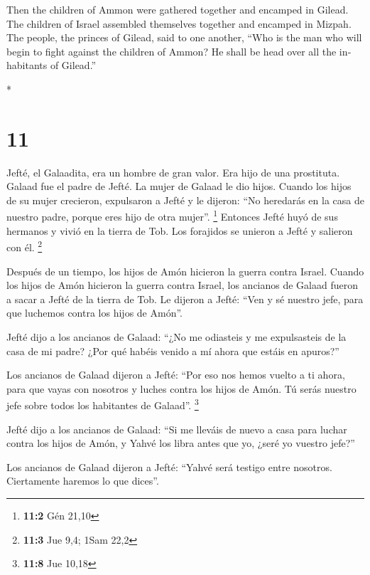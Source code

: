 \begin{paracol}{2}
\begin{otherlanguage}{english}
 Then the children of Ammon were gathered together and
encamped in Gilead. The children of Israel assembled themselves together
and encamped in Mizpah.  The people, the princes of
Gilead, said to one another, ``Who is the man who will begin to fight
against the children of Ammon? He shall be head over all the inhabitants
of Gilead.''

\end{otherlanguage}

\switchcolumn[0]*

\hypertarget{section-20}{%
\section{11}\label{section-20}}

 Jefté, el Galaadita, era un hombre de gran valor. Era
hijo de una prostituta. Galaad fue el padre de Jefté.  La
mujer de Galaad le dio hijos. Cuando los hijos de su mujer crecieron,
expulsaron a Jefté y le dijeron: ``No heredarás en la casa de nuestro
padre, porque eres hijo de otra mujer''. \footnote{\textbf{11:2} Gén
  21,10}  Entonces Jefté huyó de sus hermanos y vivió en
la tierra de Tob. Los forajidos se unieron a Jefté y salieron con él.
\footnote{\textbf{11:3} Jue 9,4; 1Sam 22,2}

 Después de un tiempo, los hijos de Amón hicieron la
guerra contra Israel.  Cuando los hijos de Amón hicieron
la guerra contra Israel, los ancianos de Galaad fueron a sacar a Jefté
de la tierra de Tob.  Le dijeron a Jefté: ``Ven y sé
nuestro jefe, para que luchemos contra los hijos de Amón''.

 Jefté dijo a los ancianos de Galaad: ``¿No me odiasteis y
me expulsasteis de la casa de mi padre? ¿Por qué habéis venido a mí
ahora que estáis en apuros?''

 Los ancianos de Galaad dijeron a Jefté: ``Por eso nos
hemos vuelto a ti ahora, para que vayas con nosotros y luches contra los
hijos de Amón. Tú serás nuestro jefe sobre todos los habitantes de
Galaad''. \footnote{\textbf{11:8} Jue 10,18}

 Jefté dijo a los ancianos de Galaad: ``Si me lleváis de
nuevo a casa para luchar contra los hijos de Amón, y Yahvé los libra
antes que yo, ¿seré yo vuestro jefe?''

 Los ancianos de Galaad dijeron a Jefté: ``Yahvé será
testigo entre nosotros. Ciertamente haremos lo que dices''.


\end{paracol}
